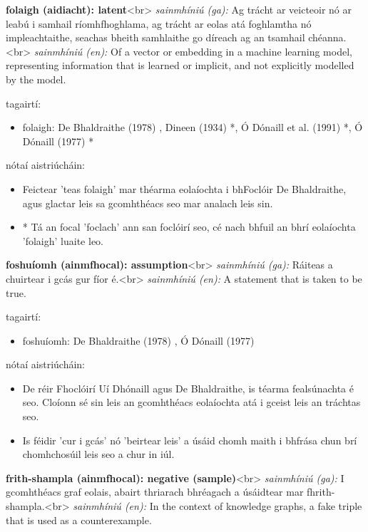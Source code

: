 \documentclass{article}
\begin{document}
\textbf{folaigh (aidiacht): latent}<br>
\textit{sainmhíniú (ga):} Ag trácht ar veicteoir nó ar leabú i samhail ríomhfhoghlama, ag trácht ar eolas atá foghlamtha nó impleachtaithe, seachas bheith samhlaithe go díreach ag an tsamhail chéanna.<br>
\textit{sainmhíniú (en):} Of a vector or embedding in a machine learning model, representing information that is learned or implicit, and not explicitly modelled by the model.

tagairtí:
\begin{itemize}
	\item folaigh: De Bhaldraithe (1978) \cite{de-bhaldraithe}, Dineen (1934) \cite{dineen}*, Ó Dónaill et al. (1991) \cite{focloir-beag}*, Ó Dónaill (1977) \cite{odonaill}*
\end{itemize}

nótaí aistriúcháin:
\begin{itemize}
	\item Feictear 'teas folaigh' mar théarma eolaíochta i bhFoclóir De Bhaldraithe, agus glactar leis sa gcomhthéacs seo mar analach leis sin.
	\item * Tá an focal 'foclach' ann san foclóirí seo, cé nach bhfuil an bhrí eolaíochta 'folaigh' luaite leo.
\end{itemize}


\textbf{foshuíomh (ainmfhocal): assumption}<br>
\textit{sainmhíniú (ga):} Ráiteas a chuirtear i gcás gur fíor é.<br>
\textit{sainmhíniú (en):} A statement that is taken to be true.

tagairtí:
\begin{itemize}
	\item foshuíomh: De Bhaldraithe (1978) \cite{de-bhaldraithe}, Ó Dónaill (1977) \cite{odonaill}
\end{itemize}

nótaí aistriúcháin:
\begin{itemize}
	\item De réir Fhoclóirí Uí Dhónaill agus De Bhaldraithe, is téarma fealsúnachta é seo. Cloíonn sé sin leis an gcomhthéacs eolaíochta atá i gceist leis an tráchtas seo.
	\item Is féidir 'cur i gcás' nó 'beirtear leis' a úsáid chomh maith i bhfrása chun brí chomhchosúil leis seo a chur in iúl.
\end{itemize}


\textbf{frith-shampla (ainmfhocal): negative (sample)}<br>
\textit{sainmhíniú (ga):} I gcomhthéacs graf eolais, abairt thriarach bhréagach a úsáidtear mar fhrith-shampla.<br>
\textit{sainmhíniú (en):} In the context of knowledge graphs, a fake triple that is used as a counterexample.
\end{document}
